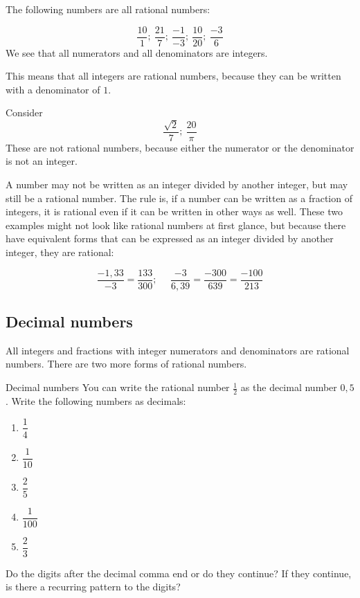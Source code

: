 The following numbers are all rational numbers:\par 


\begin{equation*}
\frac{10}{1};~\frac{21}{7};~\frac{-1}{-3};~\frac{10}{20};~\frac{-3}{6}
\end{equation*}
We see that all numerators and all denominators are integers.

This means that all integers are rational numbers, because they can be
written with a denominator of $1$.

Consider
\begin{equation*}
\frac{\sqrt{2}}{7};~\frac{20}{\pi}
\end{equation*}
These are not rational numbers, because either the numerator or the denominator is not an integer.\par 
A number may not be written as an integer divided by another integer, but may still
be a rational number. The rule is, if a number can be written
as a fraction of integers, it is rational even if it can be written in other
ways as well. These two examples might not look like rational numbers
at first glance, but because there have equivalent forms that can be expressed as an
integer divided by another integer, they are rational:\par 
\nopagebreak\noindent{}
\begin{equation*}    
\frac{-1,33}{-3}=\frac{133}{300}; ~~~~~~\frac{-3}{6,39}=\frac{-300}{639}=\frac{-100}{213}
\end{equation*}


\subsection*{Decimal numbers}
\nopagebreak
All integers and fractions with integer numerators and denominators are rational numbers. There are two more forms of rational numbers.\par 




\begin{activity}{Decimal numbers }
\nopagebreak
You can write the rational number
$\frac{1}{2}$ as the decimal number $0,5$. Write the following numbers as
decimals:\par 
\begin{enumerate}[itemsep=5pt, label=\textbf{\arabic*}. ] 
\item $\dfrac{1}{4}$
\item $\dfrac{1}{10}$
\item $\dfrac{2}{5}$
\item $\dfrac{1}{100}$
\item $\dfrac{2}{3}$
\end{enumerate}
Do the digits after the decimal comma end or do they continue? If they continue, is there a recurring pattern to the digits? \par 
\end{activity}


